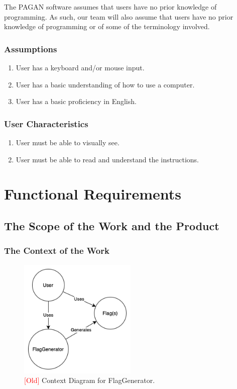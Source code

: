 \documentclass[12pt, titlepage]{article}
\begin{document}
The PAGAN software assumes that users have no prior knowledge of programming. As such, our team will also assume that users have no prior knowledge of programming or of some of the terminology involved.

\subsubsection{Assumptions}

\begin{enumerate}
  \item User has a keyboard and/or mouse input.
  \item User has a basic understanding of how to use a computer.
  \item User has a basic proficiency in English.
\end{enumerate}

\subsubsection{User Characteristics}

\begin{enumerate}
    \item User must be able to visually see.
    \item User must be able to read and understand the instructions.
\end{enumerate}

\pagebreak

\section{Functional Requirements}

\subsection{The Scope of the Work and the Product}

\subsubsection{The Context of the Work}

\begin{figure}[h!]
    \centering
    \includegraphics[width=0.5\textwidth]{FRs_WorkContext_Old.png}
    \caption{\textcolor{red}{[Old]} Context Diagram for FlagGenerator.}
    \label{fig:FRs_WC_O}
\end{figure}
\end{document}
